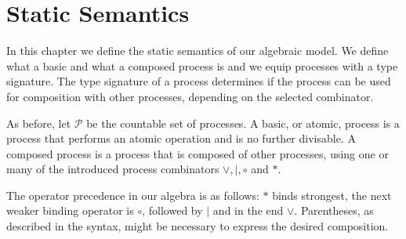 




\section{Static Semantics}
\label{chp:static_semantics}
In this chapter we define the static semantics of our algebraic model. We define what a basic and what a composed process is and we equip processes with a type signature. The type signature of a process determines if the process can be used for composition with other processes, depending on the selected combinator.

As before, let $\mathcal{P}$ be the countable set of processes. A basic, or atomic, process is a process that performs an atomic operation and is no further divisable. A composed process is a process that is composed of other processes, using one or many of the introduced process combinators $\vee, |, \circ$ and $*$.

\begin{definition}
\label{def:operator_precedence}
The operator precedence in our algebra is as follows: $*$ binds strongest, the next weaker binding operator is $\circ$, followed by $|$ and in the end $\vee$. Parentheses, as described in the syntax, might be necessary to express the desired composition.

\hfill\qedsymbol
\end{definition}

